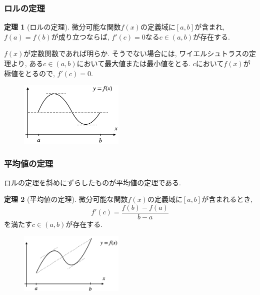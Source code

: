 \documentclass[dvipdfmx,cjk,10.2pt]{beamer}
\theoremstyle{definition}
\newtheorem{Thm}{定理}[section]
\begin{document}
\begin{frame}
\frametitle{ロルの定理}


\begin{Thm}[ロルの定理]
微分可能な関数$f(x)$の定義域に$[a,b]$が含まれ, $f(a)=f(b)$が成り立つならば, 
$f'(c)=0$なる$c \in (a,b)$が存在する. 
\end{Thm}

$f(x)$が定数関数であれば明らか. 
そうでない場合には, ワイエルシュトラスの定理より, ある$c \in (a,b)$において最大値または最小値をとる. 
$c$において$f(x)$が極値をとるので, $f'(c)=0$. 

 \begin{figure}[htbp]
 \begin{center} 
  \includegraphics[width=50mm]{Roll.png}
 \end{center}
\end{figure}

\end{frame}







\begin{frame}
\frametitle{平均値の定理}

ロルの定理を斜めにずらしたものが平均値の定理である. 

\begin{Thm}[平均値の定理]
微分可能な関数$f(x)$の定義域に$[a,b]$が含まれるとき,
$$
f'(c)=\frac{f(b)-f(a)}{b-a}
$$
を満たす$c \in (a,b)$が存在する. 
\end{Thm}

 \begin{figure}[htbp]
 \begin{center} 
  \includegraphics[width=50mm]{Mean.png}
 \end{center}
\end{figure}

\end{frame}
\end{document}
